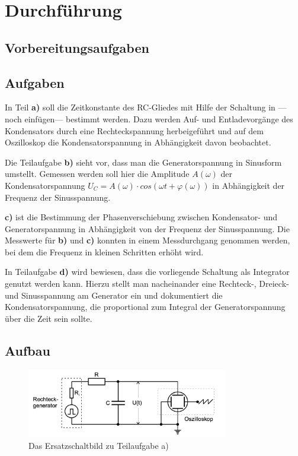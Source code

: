 \section{Durchführung}
\label{sec:Durchfuehrung}

\subsection{Vorbereitungsaufgaben}



\subsection{Aufgaben}
\label{subsec:Aufgaben}

In Teil \textbf{a)} soll die Zeitkonstante des RC-Gliedes mit Hilfe der Schaltung in
---noch einfügen--- bestimmt werden. 
Dazu werden Auf- und Entladevorgänge des Kondensators 
durch eine Rechteckspannung herbeigeführt und auf dem Oszilloskop die Kondensatorspannung in 
Abhängigkeit davon beobachtet.

Die Teilaufgabe \textbf{b)} sieht vor, dass man die Generatorspannung in Sinusform umstellt.
Gemessen werden soll hier die Amplitude $A(\omega)$ der Kondensatorspannung
 $U_C = A(\omega) \cdot cos(\omega t + \varphi(\omega))$ in Abhängigkeit der Frequenz
der Sinusspannung.

\textbf{c)} ist die Bestimmung der Phasenverschiebung zwischen Kondensator- und 
Generatorspannung in Abhängigkeit von der Frequenz der Sinusspannung. Die Messwerte für \textbf{b)} und \textbf{c)} konnten in einem 
Messdurchgang genommen werden, bei dem die Frequenz in kleinen Schritten erhöht wird.

In Teilaufgabe \textbf{d)} wird bewiesen, dass die vorliegende Schaltung als Integrator genutzt werden kann.
Hierzu stellt man nacheinander eine Rechteck-, Dreieck- und Sinusspannung am Generator ein und dokumentiert 
die Kondensatorspannung, die proportional zum Integral der Generatorspannung über die Zeit sein sollte.



\subsection{Aufbau}
\label{subsec:Aufbau}

\begin{figure}
    \centering
    \includegraphics[height=3cm]{content/esb1.png}
    \caption{Das Ersatzschaltbild zu Teilaufgabe a)}
\end{figure}

